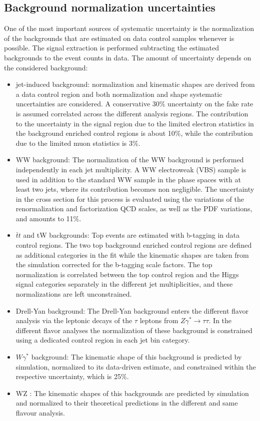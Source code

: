 \subsection*{Background normalization uncertainties}
One of the most important sources of systematic uncertainty is the normalization of the backgrounds that are estimated on data control samples whenever is possible. The signal extraction is performed subtracting the estimated backgrounds to the event counts in data. The amount of uncertainty depends on the considered background:
\begin{itemize}
\item  jet-induced background: normalization and kinematic shapes are derived from a
data control region and both normalization and shape systematic uncertainties are
considered. A conservative 30$\%$ uncertainty on the fake rate is assumed correlated across the different analysis regions. The contribution to the uncertainty in the signal region due to the limited electron statistics in the background enriched control regions is about 10\%, while the contribution due
to the limited muon statistics is 3\%. 
\item WW background: The normalization of the WW background is performed independently in each jet multiplicity. 
A WW electroweak (VBS) sample is used in addition to the standard WW sample in
the phase spaces with at least two jets, where its contribution becomes non negligible.
The uncertainty in the cross section for this process is evaluated using the variations
of the renormalization and factorization QCD scales, as well as the PDF variations,
and amounts to 11\%.
\item $\bar{t}t$ and tW backgrounds: Top events are estimated with b-tagging in data control regions. The two top background enriched control regions are defined as additional categories in the fit while the kinematic shapes are taken from the simulation corrected for the b-tagging scale factors. The top normalization is correlated between the top control region and the Higgs signal categories separately in
the different jet multiplicities, and these normalizations are left unconstrained. 
\item Drell-Yan background: The Drell-Yan background enters the different flavor analysis via the leptonic decays of the $\tau$ leptons from $Z \gamma^* \to \tau \tau$. In the different flavor
analyses the normalization of these background is constrained using a dedicated control region in each jet bin category. 

\item $W \gamma^*$ background: The kinematic shape of this background is predicted by simulation, normalized to its data-driven estimate, and constrained within the respective
uncertainty, which is 25\%.
\item WZ : The kinematic shapes of this backgrounds are predicted by simulation and
normalized to their theoretical predictions in the different and same flavour analysis.


\end{itemize}
